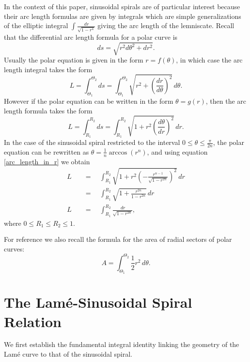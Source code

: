 \documentclass{amsart}
\theoremstyle{definition}
\begin{document}
In the context of this paper, sinusoidal spirals are of particular interest because their arc length formulas are given by
integrals which are simple generalizations of the elliptic integral $\int\frac{\,dr}{\sqrt{1-r^4}}$ giving the arc length of
the lemniscate. Recall that the differential arc length formula for a polar curve is
\begin{equation}\label{infinitesimal_arc_length}
ds=\sqrt{r^2d\theta^2 +dr^2}.
\end{equation}
Usually the polar equation is given in the form $r=f(\theta)$, in which case the arc length integral takes the form
\begin{equation}
L=\int_{\Theta_1}^{\Theta_2}ds =\int_{\Theta_1}^{\Theta_2}\sqrt{r^2+\left(\frac{dr}{d\theta}\right)^2}\,d\theta.
\end{equation}
However if the polar equation can be written in the form $\theta=g(r)$, then the arc length formula takes the form
\begin{equation}\label{arc_length_in_r}
L=\int_{R_1}^{R_2}ds =\int_{R_1}^{R_2}\sqrt{1+r^2\left(\frac{d\theta}{dr}\right)^2}\,dr.
\end{equation}
In the case of the sinusoidal spiral restricted to the interval $0\le\theta\le\frac{\pi}{2n}$, the polar equation 
can be rewritten as $\theta=\frac{1}{n}\arccos(r^n)$, and using equation \eqref{arc_length_in_r} we obtain
\begin{align}
L &\quad=\quad \int_{R_1}^{R_2}\sqrt{1+r^2\left(-\frac{r^{n-1}}{\sqrt{1-r^{2n}}}\right)^2}\,dr\nonumber\\
&\quad=\quad \int_{R_1}^{R_2}\sqrt{1+\frac{r^{2n}}{1-r^{2n}}}\,dr\nonumber\\
L&\quad=\quad \int_{R_1}^{R_2}\frac{\,dr}{\sqrt{1-r^{2n}}},\label{sinusoidal_arc_length}
\end{align}
where $0\le R_1\le R_2\le 1$.

For reference we also recall the formula for the area of radial sectors of polar curves:
\begin{equation}\label{polar_area_formula}
A=\int_{\Theta_1}^{\Theta_2}\frac{1}{2}r^2\,d\theta.
\end{equation}

\bigskip

\section{The Lam\'e-Sinusoidal Spiral Relation}

We first establish the fundamental integral identity linking the geometry of the Lam\'e curve to that of the sinusoidal spiral.
\end{document}
